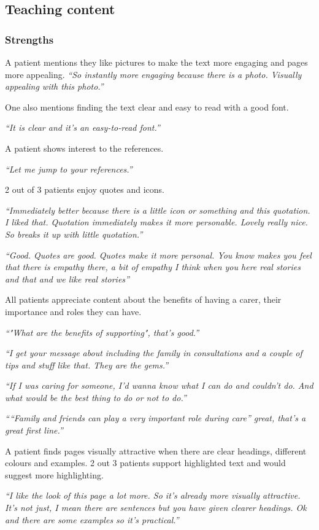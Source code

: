 \documentclass{sigchi}
\begin{document}
\subsection{Teaching content}
\subsubsection{Strengths}
A patient mentions they like pictures to make the text more engaging and pages more appealing. 
\textit{“So instantly more engaging because there is a photo. Visually appealing with this photo.”}

One also mentions finding the text clear and easy to read with a good font. 

\textit{“It is clear and it’s an easy-to-read font.”}

A patient shows interest to the references.

\textit{“Let me jump to your references.”}

2 out of 3 patients enjoy quotes and icons.

\textit{“Immediately better because there is a little icon or something and this quotation. I liked that. Quotation immediately makes it more personable. Lovely really nice. So breaks it up with little quotation.”}

\textit{“Good. Quotes are good. Quotes make it more personal. You know makes you feel that there is empathy there, a bit of empathy I think when you here real stories and that and we like real stories”}

All patients appreciate content about the benefits of having a carer, their importance and roles they can have. 

\textit{“"What are the benefits of supporting", that’s good.”}

\textit{“I get your message about including the family in consultations and a couple of tips and stuff like that. They are the gems.”}

\textit{“If I was caring for someone, I’d wanna know what I can do and couldn't do. And what would be the best thing to do or not to do.”}

\textit{““Family and friends can play a very important role during care” great, that’s a great first line.”}

A patient finds pages visually attractive when there are clear headings, different colours and examples. 2 out 3 patients support highlighted text and would suggest more highlighting.

\textit{“I like the look of this page a lot more. So it’s already more visually attractive. It’s not just, I mean there are sentences but you have given clearer headings. Ok and there are some examples so it’s practical.”}
\end{document}
